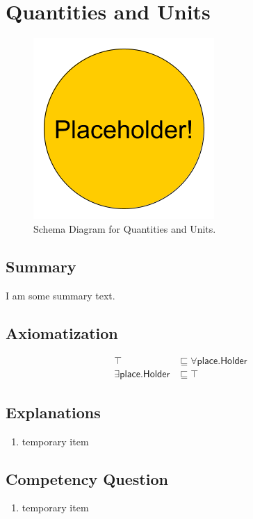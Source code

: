 \section{Quantities and Units}
\label{sec:Quantities}
\begin{figure}[h!]
\begin{center}
\includegraphics[width=.4\textwidth]{figures/placeholder}
\end{center}
\caption{Schema Diagram for Quantities and Units.}
\label{fig:Quantities}
\end{figure}
\subsection{Summary}
\label{sum:Quantities}
I am some summary text.

\subsection{Axiomatization}
\label{axs:Quantities}
\begin{align}
\top &\sqsubseteq \forall\textsf{place.Holder} \\ 
\exists\textsf{place.Holder} &\sqsubseteq \top 
\end{align}

\subsection{Explanations}
\label{exp:Quantities}
\begin{enumerate}
\item temporary item
\end{enumerate}

\subsection{Competency Question}
\label{cqs:Quantities}
\begin{enumerate}[CQ1.]
\item temporary item
\end{enumerate}

\newpage
